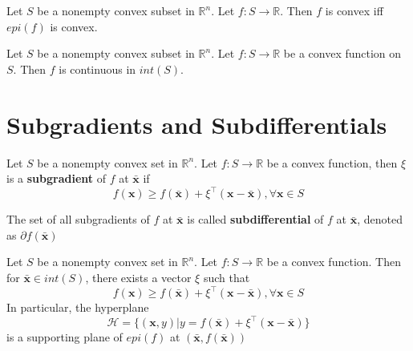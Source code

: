 				\begin{theorem}
					Let $S$ be a nonempty convex subset in $\mathbb{R}^n$. Let $f: S\rightarrow \mathbb{R}$. Then $f$ is convex iff $epi(f)$ is convex.
				\end{theorem}

				\begin{theorem}
					Let $S$ be a nonempty convex subset in $\mathbb{R}^n$. Let $f: S\rightarrow \mathbb{R}$ be a convex function on $S$. Then $f$ is continuous in $int(S)$.
				\end{theorem}

			\section{Subgradients and Subdifferentials}
				\begin{definition}[Subgradient]
					Let $S$ be a nonempty convex set in $\mathbb{R}^n$. Let $f: S\rightarrow \mathbb{R}$ be a convex function, then $\xi$ is a \textbf{subgradient} of $f$ at $\bar{\mathbf{x}}$ if
					\begin{equation}
						f(\mathbf{x}) \ge f(\bar{\mathbf{x}}) + \xi^\top(\mathbf{x} - \bar{\mathbf{x}}), \forall \mathbf{x} \in S
					\end{equation}
				\end{definition}

				\begin{definition}[Subdifferential]
					The set of all subgradients of $f$ at $\bar{\mathbf{x}}$ is called \textbf{subdifferential} of $f$ at $\bar{\mathbf{x}}$, denoted as $\partial f(\bar{\mathbf{x}})$
				\end{definition}

				\begin{theorem}
					Let $S$ be a nonempty convex set in $\mathbb{R}^n$. Let $f: S\rightarrow \mathbb{R}$ be a convex function. Then for $\bar{\mathbf{x}} \in int(S)$, there exists a vector $\xi$ such that
					\begin{equation}
						f(\mathbf{x}) \ge f(\bar{\mathbf{x}}) + \xi^\top(\mathbf{x} - \bar{\mathbf{x}}), \forall \mathbf{x} \in S
					\end{equation}
					In particular, the hyperplane
					\begin{equation}
						\mathcal{H} = \{(\mathbf{x}, y)|y = f(\bar{\mathbf{x}}) + \xi^\top(\mathbf{x} - \bar{\mathbf{x}})\}
					\end{equation}
					is a supporting plane of $epi(f)$ at $(\bar{\mathbf{x}}, f(\bar{\mathbf{x}}))$
				\end{theorem}

